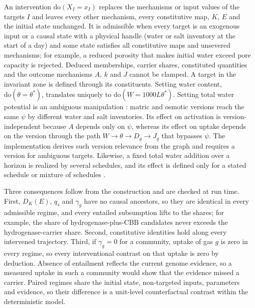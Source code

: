 \documentclass[11pt,a4paper]{article}
\begin{document}
An intervention $\mathrm{do}(X_I=x_I)$ replaces the mechanisms or input values of the targets $I$ and leaves every other mechanism, every constitutive map, $K$, $E$ and the initial state unchanged. It is admissible when every target is an exogenous input or a causal state with a physical handle (water or salt inventory at the start of a day) and some state satisfies all constitutive maps and unsevered mechanisms; for example, a reduced porosity that makes initial water exceed pore capacity is rejected. Deduced memberships, carrier shares, constituted quantities and the outcome mechanisms $A$, $k$ and $J$ cannot be clamped. A target in the invariant zone is defined through its constituents. Setting water content, $\mathrm{do}(\theta=\theta^*)$, translates uniquely to $\mathrm{do}(W=1000L\theta^*)$. Setting total water potential is an ambiguous manipulation \cite{spirtes2004ambiguous}: matric and osmotic versions reach the same $\psi$ by different water and salt inventories. Its effect on activation is version-independent because $A$ depends only on $\psi$, whereas its effect on uptake depends on the version through the path $W\to\theta\to D_g\to J_g$ that bypasses $\psi$. The implementation derives such version relevance from the graph and requires a version for ambiguous targets. Likewise, a fixed total water addition over a horizon is realized by several schedules, and its effect is defined only for a stated schedule or mixture of schedules \cite{vanderweele2013multiple}.

Three consequences follow from the construction and are checked at run time. First, $D_K(E)$, $q_s$ and $\gamma_g$ have no causal ancestors, so they are identical in every admissible regime, and every entailed subsumption lifts to the shares; for example, the share of hydrogenase-plus-CBB candidates never exceeds the hydrogenase-carrier share. Second, constitutive identities hold along every intervened trajectory. Third, if $\gamma_g=0$ for a community, uptake of gas $g$ is zero in every regime, so every interventional contrast on that uptake is zero by deduction. Absence of entailment reflects the current genome evidence, so a measured uptake in such a community would show that the evidence missed a carrier. Paired regimes share the initial state, non-targeted inputs, parameters and evidence, so their difference is a unit-level counterfactual contrast within the deterministic model.
\end{document}
